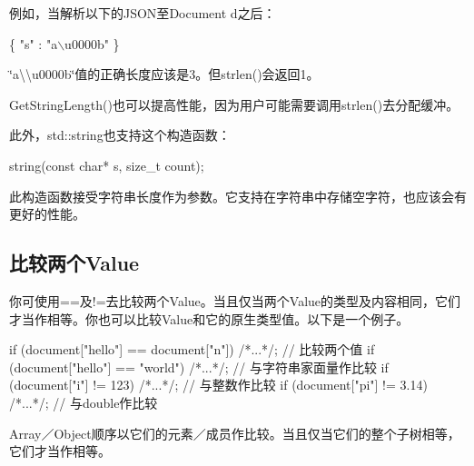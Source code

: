 例如，当解析以下的\+J\+S\+O\+N至{\ttfamily Document d}之后：


\begin{DoxyCode}
\{ \textcolor{stringliteral}{"s"} :  \textcolor{stringliteral}{"a\(\backslash\)u0000b"} \}
\end{DoxyCode}
 {\ttfamily \char`\"{}a\textbackslash{}\textbackslash{}u0000b\char`\"{}}值的正确长度应该是3。但{\ttfamily strlen()}会返回1。

{\ttfamily Get\+String\+Length()}也可以提高性能，因为用户可能需要调用{\ttfamily strlen()}去分配缓冲。

此外，{\ttfamily std\+::string}也支持这个构造函数：


\begin{DoxyCode}
string(\textcolor{keyword}{const} \textcolor{keywordtype}{char}* s, \textcolor{keywordtype}{size\_t} count);
\end{DoxyCode}


此构造函数接受字符串长度作为参数。它支持在字符串中存储空字符，也应该会有更好的性能。

\subsection*{比较两个\+Value}

你可使用{\ttfamily ==}及{\ttfamily !=}去比较两个\+Value。当且仅当两个\+Value的类型及内容相同，它们才当作相等。你也可以比较\+Value和它的原生类型值。以下是一个例子。


\begin{DoxyCode}
\textcolor{keywordflow}{if} (document[\textcolor{stringliteral}{"hello"}] == document[\textcolor{stringliteral}{"n"}]) \textcolor{comment}{/*...*/};    \textcolor{comment}{// 比较两个值}
\textcolor{keywordflow}{if} (document[\textcolor{stringliteral}{"hello"}] == \textcolor{stringliteral}{"world"}) \textcolor{comment}{/*...*/};          \textcolor{comment}{// 与字符串家面量作比较}
\textcolor{keywordflow}{if} (document[\textcolor{stringliteral}{"i"}] != 123) \textcolor{comment}{/*...*/};                  \textcolor{comment}{// 与整数作比较}
\textcolor{keywordflow}{if} (document[\textcolor{stringliteral}{"pi"}] != 3.14) \textcolor{comment}{/*...*/};                \textcolor{comment}{// 与double作比较}
\end{DoxyCode}


Array／\+Object顺序以它们的元素／成员作比较。当且仅当它们的整个子树相等，它们才当作相等。

